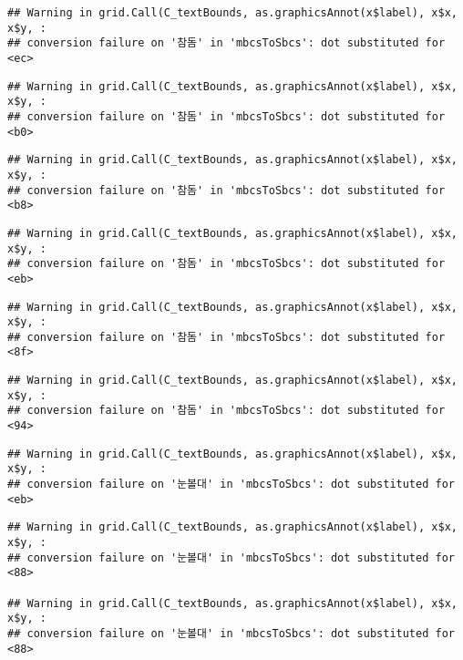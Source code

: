 \documentclass[
]{article}
\begin{document}
\begin{verbatim}
## Warning in grid.Call(C_textBounds, as.graphicsAnnot(x$label), x$x, x$y, :
## conversion failure on '참돔' in 'mbcsToSbcs': dot substituted for <ec>
\end{verbatim}

\begin{verbatim}
## Warning in grid.Call(C_textBounds, as.graphicsAnnot(x$label), x$x, x$y, :
## conversion failure on '참돔' in 'mbcsToSbcs': dot substituted for <b0>
\end{verbatim}

\begin{verbatim}
## Warning in grid.Call(C_textBounds, as.graphicsAnnot(x$label), x$x, x$y, :
## conversion failure on '참돔' in 'mbcsToSbcs': dot substituted for <b8>
\end{verbatim}

\begin{verbatim}
## Warning in grid.Call(C_textBounds, as.graphicsAnnot(x$label), x$x, x$y, :
## conversion failure on '참돔' in 'mbcsToSbcs': dot substituted for <eb>
\end{verbatim}

\begin{verbatim}
## Warning in grid.Call(C_textBounds, as.graphicsAnnot(x$label), x$x, x$y, :
## conversion failure on '참돔' in 'mbcsToSbcs': dot substituted for <8f>
\end{verbatim}

\begin{verbatim}
## Warning in grid.Call(C_textBounds, as.graphicsAnnot(x$label), x$x, x$y, :
## conversion failure on '참돔' in 'mbcsToSbcs': dot substituted for <94>
\end{verbatim}

\begin{verbatim}
## Warning in grid.Call(C_textBounds, as.graphicsAnnot(x$label), x$x, x$y, :
## conversion failure on '눈볼대' in 'mbcsToSbcs': dot substituted for <eb>
\end{verbatim}

\begin{verbatim}
## Warning in grid.Call(C_textBounds, as.graphicsAnnot(x$label), x$x, x$y, :
## conversion failure on '눈볼대' in 'mbcsToSbcs': dot substituted for <88>

## Warning in grid.Call(C_textBounds, as.graphicsAnnot(x$label), x$x, x$y, :
## conversion failure on '눈볼대' in 'mbcsToSbcs': dot substituted for <88>
\end{verbatim}
\end{document}
